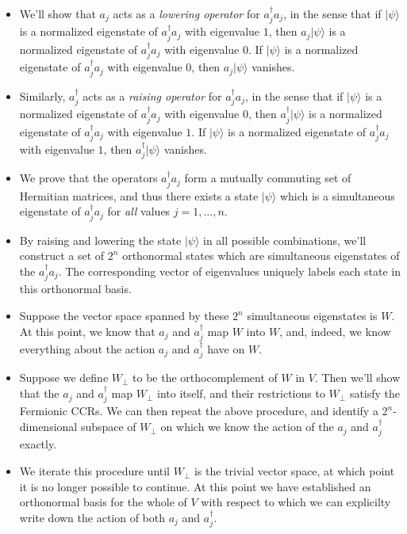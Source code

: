 \documentclass[12pt]{article}
\begin{document}
{\begin{itemize}
\item We'll show that $a_j$ acts as a \emph{lowering operator} for
  $a_j^\dagger a_j$, in the sense that if $|\psi\rangle$ is a
  normalized eigenstate of $a_j^\dagger a_j$ with eigenvalue $1$, then
  $a_j |\psi\rangle$ is a normalized eigenstate of $a_j^\dagger a_j$
  with eigenvalue $0$.  If $|\psi\rangle$ is a normalized eigenstate
  of $a_j^\dagger a_j$ with eigenvalue $0$, then $a_j |\psi\rangle$
  vanishes.
  
\item Similarly, $a_j^\dagger$ acts as a \emph{raising operator} for
  $a_j^\dagger a_j$, in the sense that if $|\psi\rangle$ is a
  normalized eigenstate of $a_j^\dagger a_j$ with eigenvalue $0$, then
  $a_j^\dagger |\psi\rangle$ is a normalized eigenstate of
  $a_j^\dagger a_j$ with eigenvalue $1$.  If $|\psi\rangle$ is a
  normalized eigenstate of $a_j^\dagger a_j$ with eigenvalue $1$, then
  $a_j^\dagger |\psi\rangle$ vanishes.

  
\item We prove that the operators $a_j^\dagger a_j$ form a mutually
  commuting set of Hermitian matrices, and thus there exists a state
  $|\psi\rangle$ which is a simultaneous eigenstate of $a_j^\dagger
  a_j$ for \emph{all} values $j=1,\ldots,n$.
  
\item By raising and lowering the state $|\psi\rangle$ in all possible
  combinations, we'll construct a set of $2^n$ orthonormal states
  which are simultaneous eigenstates of the $a_j^\dagger a_j$.  The
  corresponding vector of eigenvalues uniquely labels each state in
  this orthonormal basis.
  
\item Suppose the vector space spanned by these $2^n$ simultaneous
  eigenstates is $W$.  At this point, we know that $a_j$ and
  $a_j^\dagger$ map $W$ into $W$, and, indeed, we know everything
  about the action $a_j$ and $a_j^\dagger$ have on $W$.
  
\item Suppose we define $W_\perp$ to be the orthocomplement of $W$ in
  $V$.  Then we'll show that the $a_j$ and $a_j^\dagger$ map $W_\perp$
  into itself, and their restrictions to $W_\perp$ satisfy the
  Fermionic CCRs.  We can then repeat the above procedure, and
  identify a $2^n$-dimensional subspace of $W_\perp$ on which we know
  the action of the $a_j$ and $a_j^\dagger$ exactly.
  
\item We iterate this procedure until $W_\perp$ is the trivial vector
  space, at which point it is no longer possible to continue.  At this
  point we have established an orthonormal basis for the whole of $V$
  with respect to which we can explicilty write down the action of both
  $a_j$ and $a_j^\dagger$.
\end{itemize}

}
\end{document}
